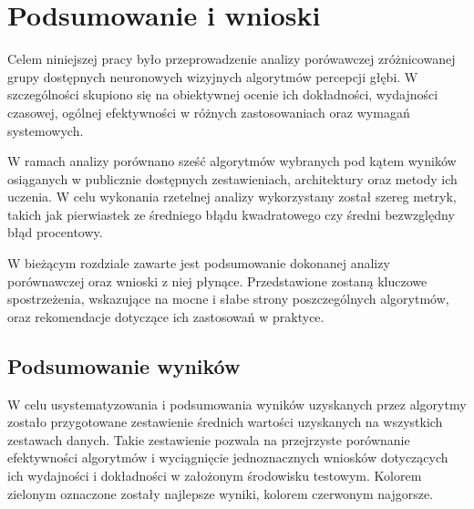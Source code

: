 \chapter{Podsumowanie i wnioski}\label{chap:podsumowanie_i_wnioski}
Celem niniejszej pracy było przeprowadzenie analizy porówawczej zróżnicowanej grupy dostępnych neuronowych wizyjnych algorytmów percepcji głębi. W szczególności skupiono się na obiektywnej ocenie ich dokładności, wydajności czasowej, ogólnej efektywności w różnych zastosowaniach oraz wymagań systemowych.

W ramach analizy porównano sześć algorytmów wybranych pod kątem wyników osiąganych w publicznie dostępnych zestawieniach, architektury oraz metody ich uczenia. W celu wykonania rzetelnej analizy wykorzystany został szereg metryk, takich jak pierwiastek ze średniego błądu kwadratowego czy średni bezwzględny błąd procentowy.

W bieżącym rozdziale zawarte jest podsumowanie dokonanej analizy porównawczej oraz wnioski z niej płynące. Przedstawione zostaną kluczowe spostrzeżenia, wskazujące na mocne i słabe strony poszczególnych algorytmów, oraz rekomendacje dotyczące ich zastosowań w praktyce.

\section{Podsumowanie wyników}
W celu usystematyzowania i podsumowania wyników uzyskanych przez algorytmy zostało przygotowane zestawienie średnich wartości uzyskanych na wszystkich zestawach danych. Takie zestawienie pozwala na przejrzyste porównanie efektywności algorytmów i wyciągnięcie jednoznacznych wniosków dotyczących ich wydajności i dokładności w założonym środowisku testowym. Kolorem zielonym oznaczone zostały najlepsze wyniki, kolorem czerwonym najgorsze.

